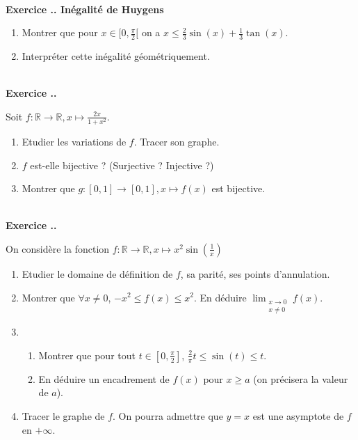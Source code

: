 \documentclass{article}
\newcommand{\mb}[1]{\mathbb{#1}}
\newcounter{exo}
\newcommand{\exercice}[1][\null]{\textbf{\\ Exercice \thesection.\theexo. #1} \addtocounter{exo}{1}}
\begin{document}
\exercice[Inégalité de Huygens]

\begin{enumerate}

\item Montrer que pour $x \in [0, \frac{\pi}{2}[$ on a $x \le \frac{2}{3} \sin(x) + \frac{1}{3} \tan(x) $.

\item Interpréter cette inégalité géométriquement.

\end{enumerate}


\exercice 

Soit $f : \mb{R} \rightarrow \mb{R}, x \mapsto \frac{2x}{1+x^2}$.
\begin{enumerate}
\item Etudier les variations de $f$. Tracer son graphe.

\item $f$ est-elle bijective ? (Surjective ? Injective ?)

\item Montrer que $g : [0,1] \rightarrow [0,1], x \mapsto f(x)$ est bijective.
\end{enumerate}




\exercice

On considère la fonction $f : \mb{R} \rightarrow \mb{R}, x \mapsto x^2 \sin(\frac{1}{x})$

\begin{enumerate}

\item Etudier le domaine de définition de $f$, sa parité, ses points d'annulation.

\item Montrer que $\forall x \neq 0$, $-x^2 \le f(x) \le x^2$. En déduire $\displaystyle \lim_{\substack{x \rightarrow 0\\x \neq 0}} f(x)$.

\item \begin{enumerate}

\item Montrer que pour tout $t\in [0,\frac{\pi}{2}]$, $\frac{2}{\pi}t \le \sin(t) \le t$.

\item En déduire un encadrement de $f(x)$ pour $x \ge a$ (on précisera la valeur de $a$).

\end{enumerate}

\item Tracer le graphe de $f$. On pourra admettre que $y =x$ est une asymptote de $f$ en $+ \infty$.
\end{enumerate}
\end{document}
